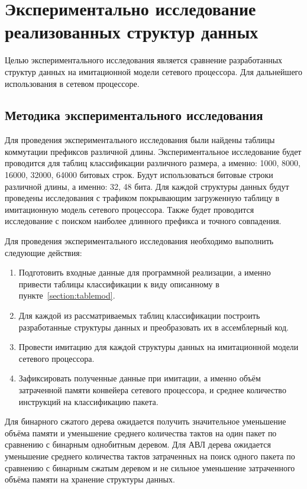 \documentclass[a4paper, 12pt, titlepage, finall]{extreport}
\begin{document}
         
    \chapter{Экспериментально исследование реализованных структур данных}
        Целью экспериментального исследования является сравнение разработанных структур данных на имитационной модели сетевого процессора. Для дальнейшего использования в сетевом процессоре.

           
        \section{Методика экспериментального исследования}
            Для проведения экспериментального исследования были найдены таблицы коммутации префиксов различной длины. Экспериментальное исследование будет проводится
            для таблиц классификации различного размера, а именно: 1000, 8000, 16000, 32000, 64000 битовых строк. Будут использоваться битовые строки различной длины, а именно:
            32, 48 бита. Для каждой структуры данных будут проведены исследования с трафиком покрывающим загруженную таблицу в имитационную модель сетевого процессора.
            Также будет проводится исследование с поиском наиболее длинного префикса и точного совпадения.
            
            Для проведения экспериментального исследования необходимо выполнить следующие действия:
            \begin{enumerate}
                \item Подготовить входные данные для программной реализации, а именно привести таблицы классификации к виду описанному в пункте~\ref{section:tablemod}.
                \item Для каждой из рассматриваемых таблиц классификации построить разработанные структуры данных и преобразовать их в ассемблерный код.
                \item Провести имитацию для каждой структуры данных на имитационной модели сетевого процессора.
                \item Зафиксировать полученные данные при имитации, а именно объём затраченной памяти конвейера сетевого процессора, и среднее количество инструкций
                    на классификацию пакета.
            \end{enumerate}

            Для бинарного сжатого дерева ожидается получить значительное уменьшение объёма памяти и уменьшение среднего количества тактов на один пакет 
            по сравнению с бинарным однобитным деревом.
            Для АВЛ дерева ожидается уменьшение среднего количества тактов затраченных на поиск одного пакета по сравнению с бинарным сжатым деревом и 
            не сильное уменьшение затраченного объёма памяти на хранение структуры данных.
\end{document}

